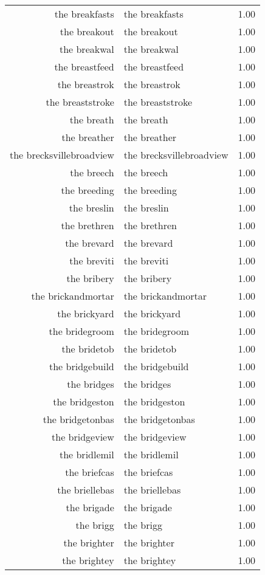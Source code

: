 \begin{table}[ht]
\begin{tabular}{rlr}
  the breakfasts & the breakfasts & 1.00 \\ 
  the breakout & the breakout & 1.00 \\ 
  the breakwal & the breakwal & 1.00 \\ 
  the breastfeed & the breastfeed & 1.00 \\ 
  the breastrok & the breastrok & 1.00 \\ 
  the breaststroke & the breaststroke & 1.00 \\ 
  the breath & the breath & 1.00 \\ 
  the breather & the breather & 1.00 \\ 
  the brecksvillebroadview & the brecksvillebroadview & 1.00 \\ 
  the breech & the breech & 1.00 \\ 
  the breeding & the breeding & 1.00 \\ 
  the breslin & the breslin & 1.00 \\ 
  the brethren & the brethren & 1.00 \\ 
  the brevard & the brevard & 1.00 \\ 
  the breviti & the breviti & 1.00 \\ 
  the bribery & the bribery & 1.00 \\ 
  the brickandmortar & the brickandmortar & 1.00 \\ 
  the brickyard & the brickyard & 1.00 \\ 
  the bridegroom & the bridegroom & 1.00 \\ 
  the bridetob & the bridetob & 1.00 \\ 
  the bridgebuild & the bridgebuild & 1.00 \\ 
  the bridges & the bridges & 1.00 \\ 
  the bridgeston & the bridgeston & 1.00 \\ 
  the bridgetonbas & the bridgetonbas & 1.00 \\ 
  the bridgeview & the bridgeview & 1.00 \\ 
  the bridlemil & the bridlemil & 1.00 \\ 
  the briefcas & the briefcas & 1.00 \\ 
  the briellebas & the briellebas & 1.00 \\ 
  the brigade & the brigade & 1.00 \\ 
  the brigg & the brigg & 1.00 \\ 
  the brighter & the brighter & 1.00 \\ 
  the brightey & the brightey & 1.00 \\ 

\end{tabular}
\end{table}
